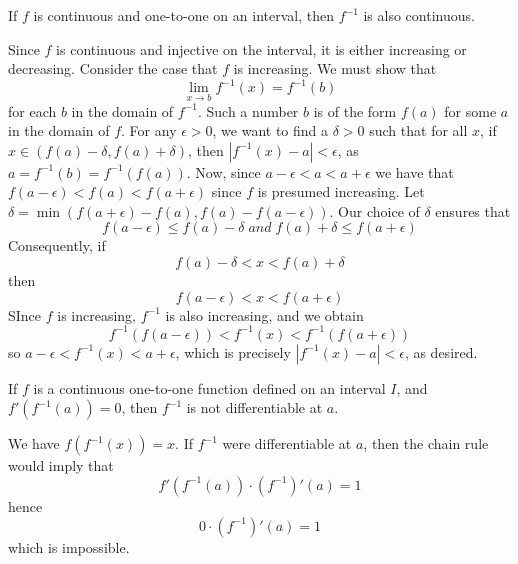 \documentclass[12pt]{report}
\begin{document}
\begin{thm}{}{}
    If $f$ is continuous and one-to-one on an interval, then $f^{-1}$ is also continuous.
\end{thm}
\begin{proof*}{}{}
    Since $f$ is continuous and injective on the interval, it is either increasing or decreasing. Consider the case that $f$ is increasing. We must show that \begin{equation*}
        \lim\limits_{x\rightarrow b}f^{-1}(x) = f^{-1}(b)
    \end{equation*}
    for each $b$ in the domain of $f^{-1}$. Such a number $b$ is of the form $f(a)$ for some $a$ in the domain of $f$. For any $\epsilon > 0$, we want to find a $\delta > 0$ such that for all $x$, if $x \in (f(a) - \delta, f(a) + \delta)$, then $|f^{-1}(x) - a| < \epsilon$, as $a = f^{-1}(b) = f^{-1}(f(a))$. Now, since $a-\epsilon < a <a+\epsilon$ we have that $f(a-\epsilon) < f(a) < f(a+\epsilon)$ since $f$ is presumed increasing. Let $\delta = \min(f(a+\epsilon)-f(a),f(a) - f(a-\epsilon))$. Our choice of $\delta$ ensures that $$f(a-\epsilon) \leq f(a) - \delta\;and\;f(a) + \delta \leq f(a+\epsilon)$$
    Consequently, if $$f(a) - \delta < x < f(a) + \delta$$ then $$f(a-\epsilon) < x < f(a+\epsilon)$$
    SInce $f$ is increasing, $f^{-1}$ is also increasing, and we obtain $$f^{-1}(f(a-\epsilon)) < f^{-1}(x) < f^{-1}(f(a+\epsilon))$$
    so $a-\epsilon < f^{-1}(x) < a+\epsilon$, which is precisely $|f^{-1}(x) - a| < \epsilon$, as desired.
\end{proof*}


\begin{thm}{}{}
    If $f$ is a continuous one-to-one function defined on an interval $I$, and $f'(f^{-1}(a)) = 0$, then $f^{-1}$ is not differentiable at $a$.
\end{thm}
\begin{proof*}{}{}
    We have $f(f^{-1}(x)) = x$. If $f^{-1}$ were differentiable at $a$, then the chain rule would imply that $$f'(f^{-1}(a))\cdot (f^{-1})'(a) = 1$$
    hence $$0\cdot (f^{-1})'(a) = 1$$
    which is impossible.
\end{proof*}
\end{document}
